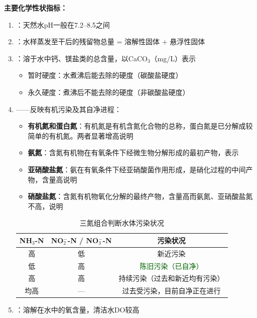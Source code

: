 \documentclass[10pt,a4paper,oneside]{ctexbook}
\begin{document}
\begin{keybox}
\textbf{主要化学性状指标：}

\begin{enumerate}[leftmargin=*]
    \item {}：天然水pH一般在7.2--8.5之间
    \item {}：水样蒸发至干后的残留物总量 = 溶解性固体 + 悬浮性固体
    \item {}：溶于水中钙、镁盐类的总含量，以CaCO$_3$（mg/L）表示
    \begin{itemize}
        \item 暂时硬度：水煮沸后能去除的硬度（碳酸盐硬度）
        \item 永久硬度：煮沸后不能去除的硬度（非碳酸盐硬度）
    \end{itemize}
    \item {}——反映有机污染及其自净进程：
    \begin{itemize}
        \item \textbf{有机氮和蛋白氮}：有机氮是有机含氮化合物的总称，蛋白氮是已分解成较简单的有机氮。两者显著增高说明
        \item \textbf{氨氮}：含氮有机物在有氧条件下经微生物分解形成的最初产物，表示
        \item \textbf{亚硝酸盐氮}：氨在有氧条件下经亚硝酸菌作用形成，是硝化过程的中间产物，含量高说明
        \item \textbf{硝酸盐氮}：含氮有机物氧化分解的最终产物，含量高而氨氮、亚硝酸盐氮不高，说明
    \end{itemize}
    \begin{table}[H]
    \centering
    \caption{三氮组合判断水体污染状况}
    \begin{tabular}{ccc}
    \hline
    \textbf{NH$_3$-N} & \textbf{NO$_2^-$-N / NO$_3^-$-N} & \textbf{污染状况} \\
    \hline
    高 & 低 & \textcolor{keyred}{新近污染} \\
    低 & 高 & \textcolor{darkgreen}{陈旧污染（已自净）} \\
    高 & 高 & 持续污染（过去和新近均有污染） \\
    均高 & — & 过去受污染，目前自净正在进行 \\
    \hline
    \end{tabular}
    \end{table}
    \item {}：溶解在水中的氧含量，清洁水DO较高

\end{enumerate}
\end{keybox}
\end{document}
